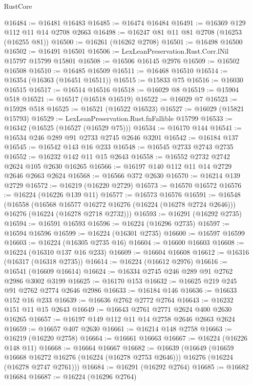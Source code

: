 \begin{lexlean}{RustCore}
\begin{coremodule}
@16484 := @16481 @16483
@16485 := @16474 @16484
@16491 := @16369 @129 @112 @11 @14 @2708 @2663
@16498 := @16247 @81 @11 @81 @2708 (@16253 (@16255 @81))
@16500 := @16261 (@16262 @2708)
@16501 := @16498 @16500
@16502 := @16491 @16501
@16506 := LexLeanPreservation.Rust.Corr.lNil @15797 @15799 @15801
@16508 := @16506 @16145 @2976
@16509 := @16502 @16508
@16510 := @16485 @16509
@16511 := @16468 @16510
@16514 := @16354 (@16363 (@16451 @16511))
@16515 := @15833 @75
@16516 := @16030 @16515
@16517 := @16514 @16516
@16518 := @16029 @8
@16519 := @15904 @518
@16521 := @16517 (@16518 @16519)
@16522 := @16029 @7
@16523 := @15928 @518
@16525 := @16521 (@16522 @16523)
@16527 := @16029 (@15821 @15793)
@16529 := LexLeanPreservation.Rust.fnFallible @15799
@16533 := @16342 (@16525 (@16527 (@16529 @75)))
@16534 := @16170 @144
@16541 := @16534 @246 @289 @91 @2733 @2745 @2646 @3201
@16542 := @16184 @137
@16545 := @16542 @143 @16 @233
@16548 := @16545 @2733 @2743 @2735
@16552 := @16232 @142 @11 @15 @2643
@16558 := @16552 @2732 @2742 @2624 @105 @2630 @16265
@16566 := @16197 @140 @112 @11 @14 @2729 @2646 @2663 @2624
@16568 := @16566 @372 @2630
@16570 := @16214 @139 @2729
@16572 := @16219 (@16220 @2729)
@16573 := @16570 @16572
@16576 := @16224 (@16226 @139 @11)
@16577 := @16573 @16576
@16591 := @16548
    (@16558
      (@16568 @16577 @16272 @16276 (@16224 (@16278 @2724 @2646)))
      @16276
      (@16224 (@16278 @2718 @2732)))
@16593 := @16291 (@16292 @2735)
@16594 := @16591 @16593
@16596 := @16224 (@16296 @2735)
@16597 := @16594 @16596
@16599 := @16224 (@16301 @2735)
@16600 := @16597 @16599
@16603 := @16224 (@16305 @2735 @16)
@16604 := @16600 @16603
@16608 := @16224 (@16310 @137 @16 @233)
@16609 := @16604 @16608
@16612 := @16316 (@16317 (@16318 @2735))
@16614 := @16224 (@16612 @2976)
@16616 := @16541 (@16609 @16614)
@16624 := @16334 @2745 @246 @289 @91 @2762 @2986 @3002 @3199
@16625 := @16170 @153
@16632 := @16625 @219 @245 @91 @2762 @2774 @2646 @2986
@16633 := @16184 @146
@16636 := @16633 @152 @16 @233
@16639 := @16636 @2762 @2772 @2764
@16643 := @16232 @151 @11 @15 @2643
@16649 := @16643 @2761 @2771 @2624 @400 @2630 @16265
@16657 := @16197 @149 @112 @11 @14 @2758 @2646 @2663 @2624
@16659 := @16657 @407 @2630
@16661 := @16214 @148 @2758
@16663 := @16219 (@16220 @2758)
@16664 := @16661 @16663
@16667 := @16224 (@16226 @148 @11)
@16668 := @16664 @16667
@16682 := @16639
    (@16649
      (@16659 @16668 @16272 @16276 (@16224 (@16278 @2753 @2646)))
      @16276
      (@16224 (@16278 @2747 @2761)))
@16684 := @16291 (@16292 @2764)
@16685 := @16682 @16684
@16687 := @16224 (@16296 @2764)

\end{coremodule}
\end{lexlean}

